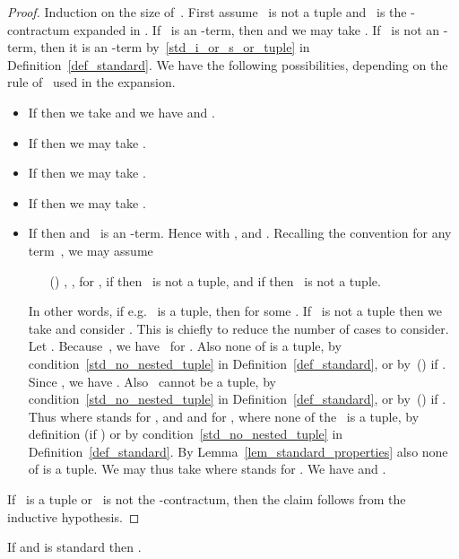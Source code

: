 \documentclass[a4paper,UKenglish]{lipics-v2016}
\begin{document}
\begin{proof}
  Induction on the size of~. First assume~ is not a tuple
  and~ is the -contractum expanded in
  . If~ is an -term, then
   and we may take
  . If~ is not an -term, then it is an -term
  by~\ref{std_i_or_s_or_tuple} in Definition~\ref{def_standard}. We
  have the following possibilities, depending on the rule of~
  used in the expansion.
  \begin{itemize}
  \item If  then
    we take  and we have  and
    .
  \item If  then
    we may take .
  \item If  then we may
    take .
  \item If  then we may take
    .
  \item If 
    then  and~ is an
    -term. Hence  with ,  and .
    Recalling the convention  for any term~, we
    may assume
    \begin{itemize}
    \item[()] , , for , if 
      then~ is not a tuple, and if  then~ is not a
      tuple.
    \end{itemize}
    In other words, if e.g.~ is a tuple, then
     for some
    . If~ is not a tuple then we take
     and consider
    . This is chiefly to
    reduce the number of cases to consider. Let . Because~, we have~
    for . Also none of  is a tuple, by
    condition~\ref{std_no_nested_tuple} in
    Definition~\ref{def_standard}, or by~() if . Since
    , we have . Also~ cannot be a tuple, by
    condition~\ref{std_no_nested_tuple} in
    Definition~\ref{def_standard}, or by~() if . Thus
     where  stands for
    , and  and
     for , where none of
    the~ is a tuple, by definition (if ) or by
    condition~\ref{std_no_nested_tuple} in
    Definition~\ref{def_standard}. By
    Lemma~\ref{lem_standard_properties} also none of 
    is a tuple. We may thus take
     where  stands
    for . We have  and
    .
  \end{itemize}
  If~ is a tuple or~ is not the -contractum, then the
  claim follows from the inductive hypothesis.
\end{proof}

\begin{lemma}\label{lem_s_a_commute}
  If  and  is standard then
  .
\end{lemma}
\end{document}
